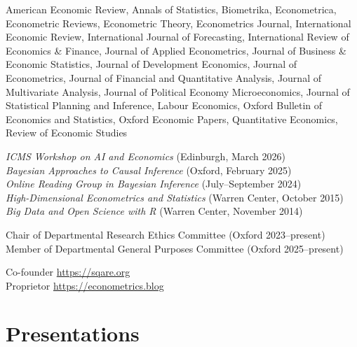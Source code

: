 \documentclass[line,overlapped]{myres}
\begin{document}
\begin{resume}
\begin{description}[style=multiline,leftmargin=3cm,font=\normalfont]
  \item[Refereeing:] American Economic Review, Annals of Statistics, Biometrika, Econometrica, Econometric Reviews, Econometric Theory, Econometrics Journal, International Economic Review, International Journal of Forecasting, International Review of Economics \& Finance, Journal of Applied Econometrics, Journal of Business \& Economic Statistics, Journal of Development Economics, Journal of Econometrics, Journal of Financial and Quantitative Analysis, Journal of Multivariate Analysis, Journal of Political Economy Microeconomics, Journal of Statistical Planning and Inference, Labour Economics, Oxford Bulletin of Economics and Statistics, Oxford Economic Papers, Quantitative Economics, Review of Economic Studies 
  \item[Workshops \\ Organized:]
    \emph{ICMS Workshop on AI and Economics} (Edinburgh, March 2026)\\
    \emph{Bayesian Approaches to Causal Inference} (Oxford, February 2025)\\
    \emph{Online Reading Group in Bayesian Inference} (July--September 2024)\\
    \emph{High-Dimensional Econometrics and Statistics} (Warren Center, October 2015)\\
    \emph{Big Data and Open Science with R} (Warren Center, November 2014)
  \item[Service:] Chair of Departmental Research Ethics Committee (Oxford 2023--present)\\ Member of Departmental General Purposes Committee (Oxford 2025--present) 
  \item[Miscellaneous:] Co-founder \url{https://sqare.org}\\ Proprietor \url{https://econometrics.blog}
\end{description}



\section{\sc Presentations}


\end{resume}
\end{document}
